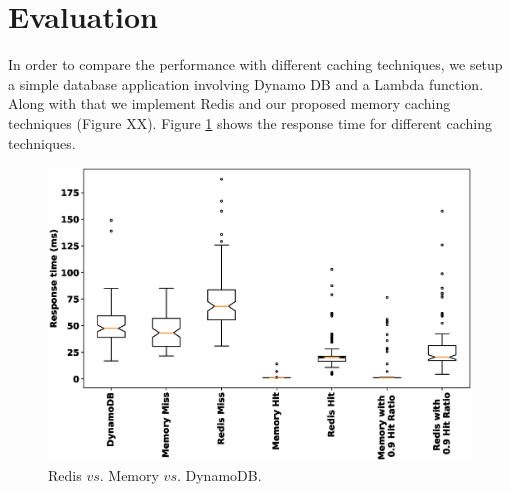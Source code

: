 \section{Evaluation}\label{eval}
In order to compare the performance with different caching techniques, we setup a simple database application involving Dynamo DB and a Lambda function. Along with that we implement Redis and our proposed memory caching techniques (Figure XX). Figure \ref{fig:RedisVsMemoryVsDynamoDB} shows the response time for different caching techniques.


\begin{figure}[h]
\center
\includegraphics[width=\linewidth]{image/redismemoryresults.eps}
		\caption{Redis $vs.$ Memory $vs.$ DynamoDB.}\label{fig:RedisVsMemoryVsDynamoDB}
\end{figure}
